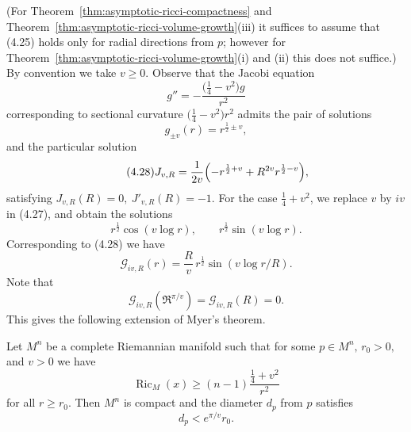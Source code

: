 (For Theorem~\ref{thm:asymptotic-ricci-compactness} and Theorem~\ref{thm:asymptotic-ricci-volume-growth}(iii) it suffices to assume that (4.25) holds
only for radial directions from \(p\); however for Theorem~\ref{thm:asymptotic-ricci-volume-growth}(i) and (ii) this
does not suffice.) By convention we take $v\ge 0$. Observe that the Jacobi
equation
\begin{equation}\tag{4.26}
g''=-\frac{\bigl(\frac14-v^2\bigr)g}{r^2}
\end{equation}
corresponding to sectional curvature \(\bigl(\frac14-v^2\bigr)r^2\) admits the
pair of solutions
\begin{equation}\tag{4.27}
g_{\pm v}(r)=r^{\frac12\pm v},
\end{equation}
and the particular solution
\begin{equation}\tag{4.28}
J_{v,R}=\frac{1}{2v}\Bigl(-r^{\frac12+v}+R^{2v}r^{\frac12-v}\Bigr),
\end{equation}
satisfying \(J_{v,R}(R)=0,\ J'_{v,R}(R)=-1\). For the case
\(\frac14+v^2\), we replace $v$ by $iv$ in (4.27), and obtain the solutions
\begin{equation}\tag{4.29}
r^{\frac12}\cos(v\log r),\qquad r^{\frac12}\sin(v\log r).
\end{equation}
Corresponding to (4.28) we have
\begin{equation}\tag{4.30}
\mathcal G_{iv,R}(r)=\frac{R}{v}\,r^{\frac12}\sin(v\log r/R).
\end{equation}
Note that
\begin{equation}\tag{4.31}
\mathcal G_{iv,R}(\Re^{\pi/v})=\mathcal G_{iv,R}(R)=0.
\end{equation}
This gives the following extension of Myer's theorem.

\begin{theorem}
\label{thm:asymptotic-ricci-compactness}

Let \(M^n\) be a complete Riemannian manifold such that for some
$p\in M^n,\, r_0>0,$ and $v>0$ we have
\begin{equation}\tag{4.32}
\operatorname{Ric}_M(x)\ge (n-1)\frac{\frac14+v^2}{r^2}
\end{equation}
for all \(r\ge r_0\). Then \(M^n\) is compact and the diameter $d_p$ from $p$
satisfies
\begin{equation}\tag{4.33}
d_p<e^{\pi/v}r_0.
\end{equation}
\end{theorem}

